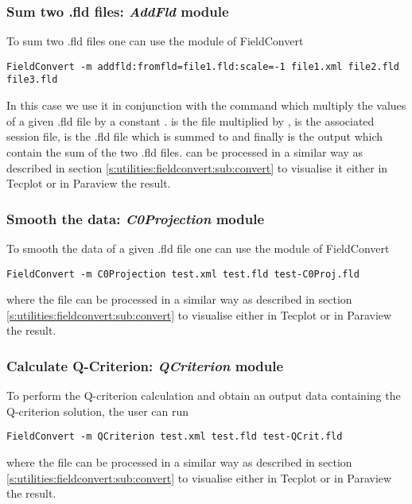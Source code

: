 \subsubsection{Sum two .fld files: \textit{AddFld} module}
To sum two .fld files one can use the  module of FieldConvert
%
\begin{lstlisting}[style=BashInputStyle]
FieldConvert -m addfld:fromfld=file1.fld:scale=-1 file1.xml file2.fld file3.fld
\end{lstlisting}
%
In this case we use it in conjunction with the command  
which multiply the values of a given .fld file by a constant . 
 is the file multiplied by ,  
is the associated session file,  is the .fld file which 
is summed to  and finally  is the output 
which contain the sum of the two .fld files.
 can be processed in a similar way as described 
in section \ref{s:utilities:fieldconvert:sub:convert} to visualise 
it either in Tecplot or in Paraview the result.
%
%
%
\subsubsection{Smooth the data: \textit{C0Projection} module}
To smooth the data of a given .fld file one can 
use the  module of FieldConvert
%
\begin{lstlisting}[style=BashInputStyle]
FieldConvert -m C0Projection test.xml test.fld test-C0Proj.fld
\end{lstlisting}
%
where the file  can be processed in a similar 
way as described in section \ref{s:utilities:fieldconvert:sub:convert}
to visualise either in Tecplot or in Paraview the result.

\subsubsection{Calculate Q-Criterion: \textit{QCriterion} module}
To perform the Q-criterion calculation and obtain an output 
data containing the Q-criterion solution, the user can run
%
\begin{lstlisting}[style=BashInputStyle]
FieldConvert -m QCriterion test.xml test.fld test-QCrit.fld
\end{lstlisting}
%
where the file  can be processed in a similar 
way as described in section \ref{s:utilities:fieldconvert:sub:convert}
to visualise either in Tecplot or in Paraview the result.
%
%
%
